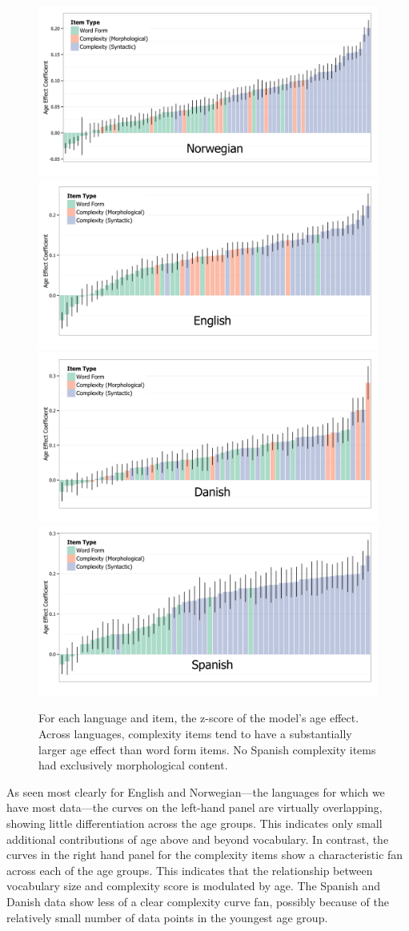 \documentclass[10pt,letterpaper]{article}
\begin{document}
\begin{figure}
\centering
\includegraphics[width=.49\textwidth]{plots/norwegian_interactions}
\includegraphics[width=.49\textwidth]{plots/english_interactions}\\
\includegraphics[width=.49\textwidth]{plots/danish_interactions}
\includegraphics[width=.49\textwidth]{plots/spanish_interactions} 
\caption{\label{fig:interactions} For each language and item, the z-score of the model's age effect. Across languages, complexity items tend to have a substantially larger age effect than word form items. No Spanish complexity items had exclusively morphological content.}
\end{figure}

As seen most clearly for English and Norwegian---the languages for which we have most data---the curves on the left-hand panel are virtually overlapping, showing little differentiation across the age groups.  This indicates only small additional contributions of age above and beyond vocabulary.  In contrast, the curves in the right hand panel for the complexity items show a characteristic fan across each of the age groups.  This indicates that the relationship between vocabulary size and complexity score is modulated by age. The Spanish and Danish data show less of a clear complexity curve fan, possibly because of the relatively small number of data points in the youngest age group.
\end{document}
